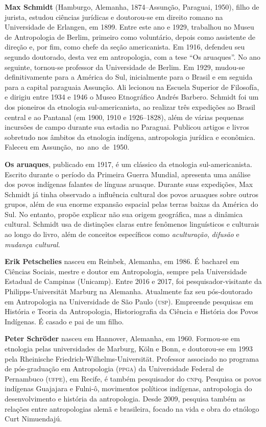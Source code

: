 \textbf{Max Schmidt} (Hamburgo, Alemanha, 1874--Assunção, Paraguai, 1950), filho de jurista, estudou ciências jurídicas e doutorou-se em direito romano na Universidade de Erlangen, em 1899. Entre este ano e 1929, trabalhou no Museu de Antropologia de Berlim, primeiro como voluntário, depois como assistente de direção e, por fim, como chefe da seção americanista. Em 1916, defendeu seu segundo doutorado, desta vez em antropologia, com a tese ``Os aruaques''. No ano seguinte, tornou-se professor da Universidade de Berlim. Em 1929, mudou-se definitivamente para a América do Sul, inicialmente para o Brasil e em seguida para a capital paraguaia Assunção. Ali lecionou na Escuela Superior de Filosofía, e dirigiu entre 1934 e 1946 o Museo Etnográfico Andrés Barbero. Schmidt foi um dos pioneiros da etnologia sul-americanista, ao realizar três expedições ao Brasil central e ao Pantanal (em 1900, 1910 e 1926--1828), além de várias pequenas incursões de campo durante sua estadia no Paraguai. Publicou artigos e livros sobretudo nos âmbitos da etnologia indígena, antropologia jurídica e econômica. Faleceu em Assunção,~no~ano~de~1950.

\textbf{Os aruaques}, publicado em 1917, é um clássico da etnologia sul-americanista. Escrito durante o período da Primeira Guerra Mundial, apresenta uma análise dos povos indígenas falantes de línguas aruaque. Durante suas expedições, Max Schmidt já tinha observado a influência cultural dos povos aruaques sobre outros grupos, além de sua enorme expansão espacial pelas terras baixas da América do Sul. No entanto, propõe explicar não sua origem geográfica, mas a dinâmica cultural. Schmidt usa de distinções claras entre fenômenos linguísticos e culturais ao longo do livro, além de conceitos específicos como \textit{aculturação}, \textit{difusão} e \textit{mudança cultural}.

\pagebreak
\thispagestyle{empty}

\textbf{Erik Petschelies} nasceu em Reinbek, Alemanha, em 1986. É bacharel em Ciências Sociais, mestre e doutor em Antropologia, sempre pela Universidade Estadual de Campinas (Unicamp). Entre 2016 e 2017, foi pesquisador-visitante da Philipps-Universität Marburg na Alemanha. Atualmente faz seu pós-doutorado em Antropologia na Universidade de São Paulo (\textsc{usp}). Empreende pesquisas em História e Teoria da Antropologia, Historiografia da Ciência e História dos Povos Indígenas. É casado e pai de um filho.

\textbf{Peter Schröder} nasceu em Hannover, Alemanha, em 1960. Formou-se em etnologia pelas universidades de Marburg, Köln e Bonn, e doutorou-se em 1993 pela Rheinische Friedrich-Wilhelms-Universität. Professor associado no programa de pós-graduação em Antropologia (\textsc{ppga}) da Universidade Federal de Pernambuco (\textsc{ufpe}), em Recife, é também pesquisador do \textsc{cnp}q. Pesquisa os povos indígenas Guajajara e Fulni-ô, movimentos políticos indígenas, antropologia do desenvolvimento e história da antropologia. Desde 2009, pesquisa também as relações entre antropologias alemã e brasileira, focado na vida e obra do etnólogo Curt Nimuendajú.

